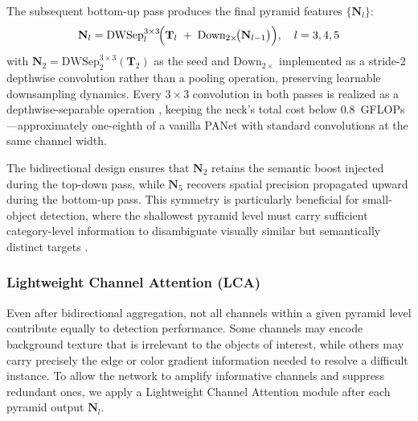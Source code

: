 The subsequent bottom-up pass produces the final pyramid
features $\{\mathbf{N}_{l}\}$:
\begin{equation}
    \mathbf{N}_{l} =
    \text{DWSep}^{3\times3}_{l}\!\Bigl(
        \mathbf{T}_{l}
        \;+\;
        \text{Down}_{2\times}\!\bigl(\mathbf{N}_{l-1}\bigr)
    \Bigr),
    \quad l = 3,4,5
    \label{eq:bottomup}
\end{equation}
with $\mathbf{N}_{2} =
\text{DWSep}^{3\times3}_{2}(\mathbf{T}_{2})$ as the seed and
$\text{Down}_{2\times}$ implemented as a stride-2 depthwise
convolution rather than a pooling operation, preserving
learnable downsampling dynamics. Every $3\times3$ convolution in
both passes is realized as a depthwise-separable operation
\cite{howard2017mobilenets}, keeping the neck's total cost
below $0.8$~GFLOPs---approximately one-eighth of a vanilla
PANet with standard convolutions at the same channel width.

The bidirectional design ensures that $\mathbf{N}_{2}$ retains
the semantic boost injected during the top-down pass, while
$\mathbf{N}_{5}$ recovers spatial precision propagated upward
during the bottom-up pass. This symmetry is particularly
beneficial for small-object detection, where the shallowest
pyramid level must carry sufficient category-level information
to disambiguate visually similar but semantically distinct
targets \cite{liu2018path}.

\subsubsection{Lightweight Channel Attention (LCA)}

Even after bidirectional aggregation, not all channels within a
given pyramid level contribute equally to detection performance.
Some channels may encode background texture that is irrelevant
to the objects of interest, while others may carry precisely
the edge or color gradient information needed to resolve a
difficult instance. To allow the network to amplify informative
channels and suppress redundant ones, we apply a Lightweight
Channel Attention module after each pyramid output
$\mathbf{N}_{l}$.

